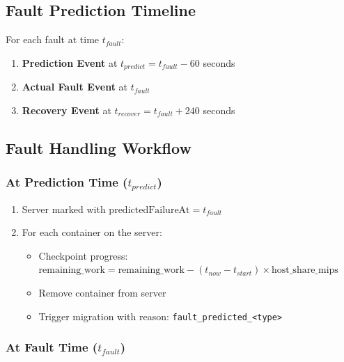 \documentclass[12pt,a4paper]{article}
\begin{document}
\subsection{Fault Prediction Timeline}

For each fault at time $t_{fault}$:
\begin{enumerate}
    \item \textbf{Prediction Event} at $t_{predict} = t_{fault} - 60$ seconds
    \item \textbf{Actual Fault Event} at $t_{fault}$
    \item \textbf{Recovery Event} at $t_{recover} = t_{fault} + 240$ seconds
\end{enumerate}

\subsection{Fault Handling Workflow}

\subsubsection{At Prediction Time ($t_{predict}$)}

\begin{enumerate}
    \item Server marked with $\text{predictedFailureAt} = t_{fault}$
    \item For each container on the server:
    \begin{itemize}
        \item Checkpoint progress: $\text{remaining\_work} = \text{remaining\_work} - (t_{now} - t_{start}) \times \text{host\_share\_mips}$
        \item Remove container from server
        \item Trigger migration with reason: \texttt{fault\_predicted\_<type>}
    \end{itemize}
\end{enumerate}

\subsubsection{At Fault Time ($t_{fault}$)}
\end{document}
